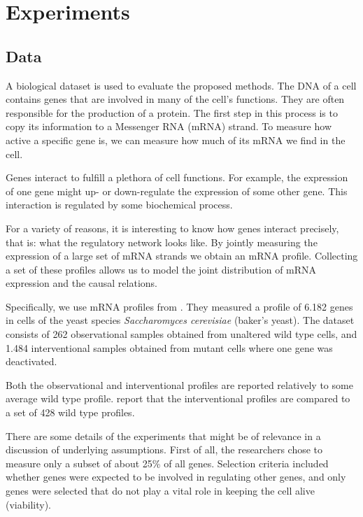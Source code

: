 \section*{Experiments}

\subsection*{Data}
A biological dataset is used to evaluate the proposed methods. The DNA of a cell contains genes that are involved in many of the cell's functions. They are often responsible for the production of a protein. The first step in this process is to copy its information to a Messenger RNA (mRNA) strand. To measure how active a specific gene is, we can measure how much of its mRNA we find in the cell.

Genes interact to fulfill a plethora of cell functions. For example, the expression of one gene might up- or down-regulate the expression of some other gene. This interaction is regulated by some biochemical process. 

For a variety of reasons, it is interesting to know how genes interact precisely, that is: what the regulatory network looks like. By jointly measuring the expression of a large set of mRNA strands we obtain an mRNA profile. Collecting a set of these profiles allows us to model the joint distribution of mRNA expression and the causal relations.

Specifically, we use mRNA profiles from \citeauthor{kemmeren2014large}. They measured a profile of 6.182 genes in cells of the yeast species \textit{Saccharomyces cerevisiae} (baker's yeast). The dataset consists of 262 observational samples obtained from unaltered wild type cells, and 1.484 interventional samples obtained from mutant cells where one gene was deactivated.

Both the observational and interventional profiles are reported relatively to some average wild type profile. \citeauthor{kemmeren2014large} report that the interventional profiles are compared to a set of 428 wild type profiles. 

There are some details of the experiments that might be of relevance in a discussion of underlying assumptions. First of all, the researchers chose to measure only a subset of about 25\% of all genes. Selection criteria included whether genes were expected to be involved in regulating other genes, and only genes were selected that do not play a vital role in keeping the cell alive (viability).


